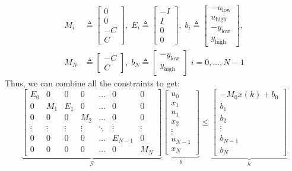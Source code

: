 \documentclass{article}
\begin{document}
\[
\begin{aligned}
    M_i &\triangleq \begin{bmatrix}
        0 \\ 0 \\ -C \\ C
    \end{bmatrix}, \; 
    E_i \triangleq \begin{bmatrix}
        -I \\ I \\ 0 \\ 0
    \end{bmatrix}, \;
    b_i \triangleq \begin{bmatrix}
    -u_{\text{low}} \\ u_{\text{high}} \\ 
    -y_{\text{low}} \\ y_{\text{high}}
\end{bmatrix}, \\ M_N &\triangleq \begin{bmatrix}
    -C \\ C
\end{bmatrix}, \; 
b_N \triangleq \begin{bmatrix}
    -y_{\text{low}} \\ y_{\text{high}}
\end{bmatrix} \;
i=0,\hdots,N-1
\end{aligned}
\]
Thus, we can combine all the constraints to get:
\[
\underbrace{
\begin{bmatrix}
    E_0 & 0 & 0 & 0 & \hdots & 0 & 0 \\
    0 & M_1 & E_1 & 0 & \hdots & 0 & 0 \\
    0 & 0 & 0 & M_2 & \hdots & 0 & 0 \\
    \vdots & \vdots & \vdots & \vdots & \ddots & \vdots & \vdots \\
    0 & 0 & 0 & 0 & \hdots & E_{N-1} & 0 \\
    0 & 0 & 0 & 0 & \hdots & 0 & M_N
\end{bmatrix}}_{\mathcal{G}} 
\underbrace{
\begin{bmatrix}
    u_0 \\ x_1 \\ u_1 \\ x_2 \\ \vdots \\ u_{N-1} \\ x_N
\end{bmatrix}}_{\theta}
\leq 
\underbrace{
\begin{bmatrix}
    -M_0 x(k) + b_0 \\ b_1 \\ b_2 \\ \vdots \\ b_{N-1} \\ b_N
\end{bmatrix}
}_{h}
\]
\end{document}

